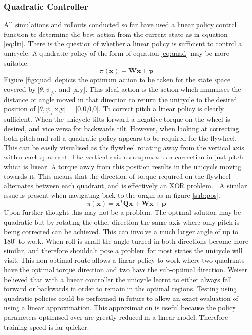 \documentclass[twoside,twocolumn,12pt]{article}
\begin{document}
\subsubsection{Quadratic Controller}
All simulations and rollouts conducted so far have used a linear policy control function to determine the best action from the current state as in equation \ref{eq:lin}. There is the question of whether a linear policy is sufficient to control a unicycle. A quadratic policy of the form of equation \ref{eq:quad} may be more suitable.
\begin{equation}
\pi (\textbf{x}) = \textbf{Wx}+\textbf{p}
\label{eq:lin}
\end{equation}
Figure \ref{fig:quad} depicts the optimum action to be taken for the state space covered by [$\theta ,\psi_f$], and [x,y]. This ideal action is the action which minimises the distance or angle moved in that direction to return the unicycle to the desired position of [$\theta ,\psi_f$,x,y] = [0,0,0,0]. 
\newline
To correct pitch a linear policy is clearly sufficient. When the unicycle tilts forward a negative torque on the wheel is desired, and vice versa for backwards tilt. However, when looking at correcting both pitch and roll a quadratic policy appears to be required for the flywheel. This can be easily visualised as the flywheel rotating away from the vertical axis within each quadrant. The vertical axis corresponds to a correction in just pitch which is linear. A torque away from this position results in the unicycle moving towards it. This means that the direction of torque required on the flywheel alternates between each quadrant, and is effectively an XOR problem. \cite{roderigo}. A similar issue is present when navigating back to the origin as in figure \ref{sub:pos}.
\begin{equation}
\pi (\textbf{x}) = \textbf{x}^T\textbf{Qx} + \textbf{Wx} + \textbf{p}
\label{eq:quad}
\end{equation}
Upon further thought this may not be a problem. The optimal solution may be quadratic but by rotating the other direction the same axis where only pitch is being corrected can be achieved. This can involve a much larger angle of up to $180^{\circ}$ to work. When roll is small the angle turned in both directions become more similar, and therefore shouldn't pose a problem for most states the unicycle will visit. This non-optimal route allows a linear policy to work where two quadrants have the optimal torque direction and two have the sub-optimal direction. Weiser believed that with a linear controller the unicycle learnt to either always fall forward or backwards in order to remain in the optimal regions. \cite{eric}
\newline
Testing using quadratic policies could be performed in future to allow an exact evaluation of using a linear approximation. This approximation is useful because the policy parameters optimised over are greatly reduced in a linear model. Therefore training speed is far quicker.
\end{document}
